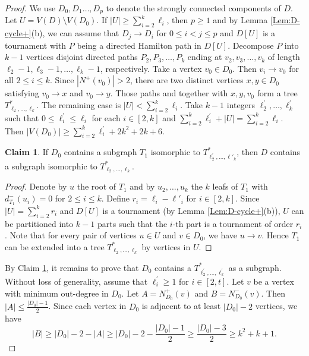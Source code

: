 \documentclass[10pt,a4paper]{article}
\theoremstyle{definition}
\newtheorem{claim}{Claim}
\begin{document}
\begin{proof}
    We use  $D_0,D_1\ldots,D_p$ to denote the strongly connected components  of $D$. Let $U=V(D)\setminus V(D_0)$. If $|U|\geq \sum_{i=2}^k{\ell_i}$, then $p\geq 1$ and by Lemma \ref{Lem:D-cycle+}(b), we can assume that $D_j\rightarrow D_i$ for $0\le i < j\le p$ and $D[U]$ is a tournament with $P$ being a directed Hamilton path in $D[U]$. Decompose $P$ into $k-1$ vertices disjoint directed paths $P_2,P_3,\ldots,P_k$ ending at $v_2,v_3,\ldots,v_k$ of length  $\ell_2-1,\ell_3-1, \ldots, \ell_k -1$, respectively.
    Take a vertex $v_0\in D_0$. Then $v_i\rightarrow v_0$ for all $2\leq i\leq k$.
    Since $|N^+(v_0)|>2$,  there are two distinct vertices $x,y\in D_0$ satisfying $v_0\rightarrow x$ and $v_0\rightarrow y$. Those paths and together with $x,y,v_0$ form a tree $T^*_{\ell_2, \ldots, \ell_k}$.
    The remaining case is  $|U|<\sum_{i=2}^k{\ell_i}$. Take $k-1$ integers $\ell^\prime_2, \ldots, \ell^\prime_k$  such that $0\leq \ell^\prime_i\le \ell_i$ for each $i\in[2,k]$ and $\sum_{i=2}^k{\ell^\prime_i}+|U|= \sum_{i=2}^k{\ell_i}$. Then $|V(D_0)|\geq\sum_{i=2}^k{\ell^\prime_i}+2k^2+2k+6$.
   \begin{claim}\label{claim:D-2}
        If $D_0$ contains a  subgraph $T_1$ isomorphic to   $T^*_{ \ell^{\prime}  _2, \ldots, \ell'_k}$, then $D$ contains  a   subgraph isomorphic to   $T^*_ {\ell_2, \ldots, \ell_k}$.
   \end{claim}
 \begin{proof}
  Denote by $u$ the root of $T_1$ and by $u_2,\ldots,u_k$  the $k$ leafs of $T_1$ with $d^-_{T_1}(u_i)=0$ for $2\leq i\leq k$.    Define $r_i = \ell_i - \ell'_i$ for $i \in [2, k]$.  Since $|U|=\sum_{i=2}^k r_i$ and $D[U]$ is a tournament (by Lemma \ref{Lem:D-cycle+}(b)), $U$ can be partitioned into $k-1$ parts such that the $i$-th part is a tournament of order $r_i$. Note that for every pair of vertices $u\in U$ and $v\in D_0$, we have $u\rightarrow v$. Hence $T_1$ can be extended into a tree $T^*_ {  \ell_2, \ldots, \ell_k}$ by vertices in $U$.
 \end{proof}


By Claim \ref{claim:D-2}, it remains to prove that $D_0$ contains a  $T^*_{ \ell^{\prime}_2, \ldots, \ell^{\prime}  _k}$ as a subgraph. Without loss of generality, assume that $\ell^{\prime}_i\geq 1$ for $i\in [2,t]$.
Let $v$ be a vertex with minimum out-degree in $D_0$. Let $A=N^+_{D_0}(v)$ and $B=N^-_{D_0}(v)$. Then $|A|\leq \frac{ |D_0|-1}{2}$. Since each vertex in $D_0$ is adjacent to at least $|D_0|-2$ vertices, we have
\begin{equation}\label{bound:B}
    |B|\geq |D_0|-2-|A|\geq |D_0|-2-\frac{ |D_0|-1}{2}\geq \frac{ |D_0|-3}{2}\geq k^2+k+1.
\end{equation}


\end{proof}
\end{document}
